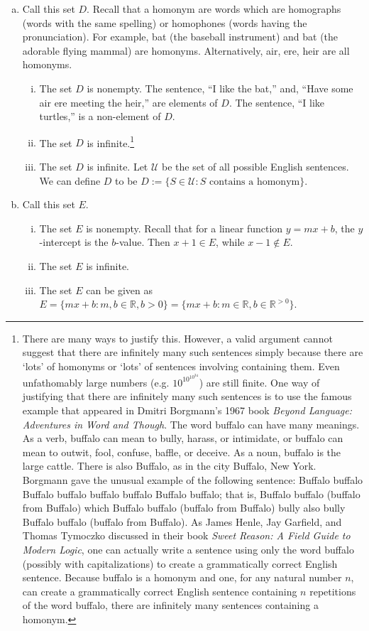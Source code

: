 \documentclass[11pt,letterpaper]{article}
\begin{document}
\begin{enumerate}[(a)]
\item Call this set $D$. Recall that a homonym are words which are homographs (words with the same spelling) or homophones (words having the pronunciation). For example, bat (the baseball instrument) and bat (the adorable flying mammal) are homonyms. Alternatively, air, ere, heir are all homonyms. 
	\begin{enumerate}[(i)]
	\item The set $D$ is nonempty. The sentence, ``I like the bat,'' and, ``Have some air ere meeting the heir,'' are elements of $D$. The sentence, ``I like turtles,'' is a non-element of $D$. 
	\item The set $D$ is infinite.\footnote{There are many ways to justify this. However, a valid argument cannot suggest that there are infinitely many such sentences simply because there are `lots' of homonyms or `lots' of sentences involving containing them. Even unfathomably large numbers (e.g. $10^{10^{10^{34}}}$) are still finite. One way of justifying that there are infinitely many such sentences is to use the famous example that appeared in Dmitri Borgmann's 1967 book \textit{Beyond Language: Adventures in Word and Though}. The word buffalo can have many meanings. As a verb, buffalo can mean to bully, harass, or intimidate, or buffalo can mean to outwit, fool, confuse, baffle, or deceive. As a noun, buffalo is the large cattle. There is also Buffalo, as in the city Buffalo, New York. Borgmann gave the unusual example of the following sentence: Buffalo buffalo Buffalo buffalo buffalo buffalo Buffalo buffalo; that is, Buffalo buffalo (buffalo from Buffalo) which Buffalo buffalo (buffalo from Buffalo) bully also bully Buffalo buffalo (buffalo from Buffalo). As James Henle, Jay Garfield, and Thomas Tymoczko discussed in their book \textit{Sweet Reason: A Field Guide to Modern Logic}, one can actually write a sentence using only the word buffalo (possibly with capitalizations) to create a grammatically correct English sentence. Because buffalo is a homonym and one, for any natural number $n$, can create a grammatically correct English sentence containing $n$ repetitions of the word buffalo, there are infinitely many sentences containing a homonym.}
	\item The set $D$ is infinite. Let $\mathcal{U}$ be the set of all possible English sentences. We can define $D$ to be $D:= \{ S \in \mathcal{U} \colon S \text{ contains a homonym} \}$. 
	\end{enumerate} \pspace

\item Call this set $E$. 
	\begin{enumerate}[(i)]
	\item The set $E$ is nonempty. Recall that for a linear function $y= mx + b$, the $y$-intercept is the $b$-value. Then $x + 1 \in E$, while $x - 1 \notin E$. 
	\item The set $E$ is infinite. 
	\item The set $E$ can be given as $E= \{ mx + b \colon m,b \in \mathbb{R}, b > 0 \}= \{ mx + b \colon m \in \mathbb{R}, b \in \mathbb{R}^{> 0} \}$. 
	\end{enumerate}
\end{enumerate}
\end{document}
